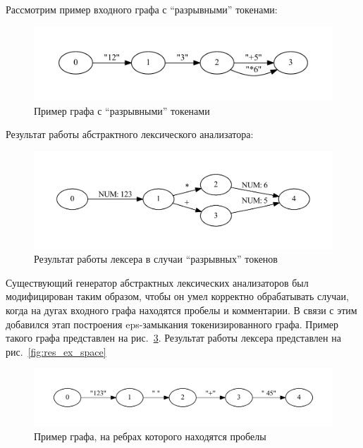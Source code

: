 Рассмотрим пример входного графа с “разрывными” токенами:

\begin{figure}[t]
\centering
\includegraphics[width=\textwidth]{Polubelova/example_calc_break}
\caption{Пример графа с ``разрывными'' токенами }
\label{fig:example_calc_break} 
\end{figure}

Результат работы абстрактного лексического анализатора:

\begin{figure}[t]
\centering
\includegraphics[width=\textwidth]{Polubelova/res_ex_calc_break}
\caption{Результат работы лексера в случаи ``разрывных'' токенов }
\label{fig:res_ex_calc_break} 
\end{figure}

Существующий генератор абстрактных лексических анализаторов был модифицирован таким образом, чтобы он умел корректно обрабатывать случаи, 
когда на дугах входного графа находятся пробелы и комментарии. В связи с этим добавился этап построения eps-замыкания токенизированного графа.
Пример такого графа представлен на рис.~\ref{fig:example_space}. Результат работы лексера представлен на рис.~\ref{fig:res_ex_space}

\begin{figure}[t]
\centering
\includegraphics[width=\textwidth]{Polubelova/example_space}
\caption{Пример графа, на ребрах которого находятся пробелы}
\label{fig:example_space} 
\end{figure}

